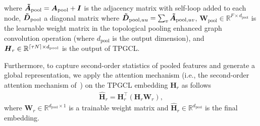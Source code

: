 \documentclass[letterpaper]{article} %
\DeclarePairedDelimiter{\ceil}{\lceil}{\rceil}
\begin{document}
where $\boldsymbol{\Tilde{A}}_{\text{pool}} = \boldsymbol{A}_{\text{pool}} + \boldsymbol{I}$ is the adjacency matrix with self-loop added to each node, $\boldsymbol{\Tilde{D}}_{\text{pool}}$ a diagonal matrix where $\boldsymbol{\Tilde{D}}_{\text{pool},uu} = \sum_{v}\boldsymbol{\Tilde{A}}_{\text{pool}, uv}$, $\boldsymbol{W}_{\text{pool}} \in \mathbb{R}^{F \times d_{\text{pool}}}$ is the learnable weight matrix in the topological pooling enhanced graph convolution operation (where $d_{\text{pool}}$ is the output dimension), and $\boldsymbol{H}_r \in \mathbb{R}^{\ceil{\tau N} \times d_{\text{pool}}}$ is the output of TPGCL.

Furthermore, to capture second-order statistics of pooled features and generate a global representation, we apply the attention mechanism (i.e., the second-order attention mechanism of~\citet{girdhar2017attentional}) on the TPGCL embedding $\boldsymbol{H}_r$ as follows
\begin{align}
\label{TP_output}
\boldsymbol{\hat{H}}_r = \boldsymbol{H}^{\top}_r (\boldsymbol{H}_r \boldsymbol{W}_r),
\end{align}
where $\boldsymbol{W}_r \in \mathbb{R}^{d_{\text{pool}} \times 1}$ is a trainable weight matrix and $\boldsymbol{\hat{H}}_r \in \mathbb{R}^{d_{\text{pool}}}$ is the final embedding.
\end{document}
